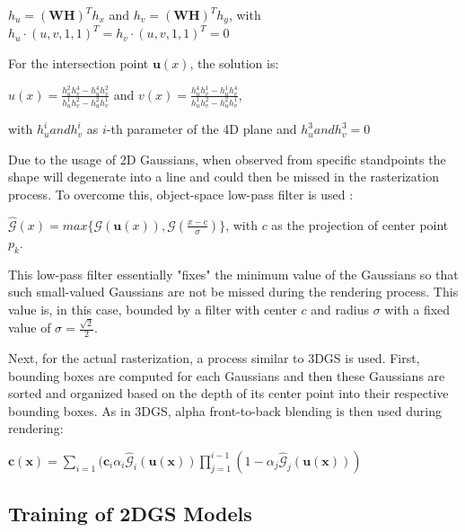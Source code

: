 \begin{center}
    \(h_u = (\mathbf{WH})^Th_x\) and \(h_v = (\mathbf{WH})^Th_y\),
    with \(h_u \cdot (u, v, 1, 1)^T = h_v \cdot (u, v, 1, 1)^T = 0\)
\end{center}

For the intersection point \(\mathbf{u}(x)\), the solution is:
\begin{center}
    \(u(x) = \frac{h^2_uh^4_v - h^4_uh^2_v}{h^1_uh^2_v - h^2_uh^1_v}\) and
    \(v(x) = \frac{h^4_uh^1_v - h^1_uh^4_v}{h^1_uh^2_v - h^2_uh^1_v}\), 
    
    with \(h^i_u and h^i_v\) as \(i\)-th parameter of the 4D plane and 
    \(h^3_u and h^3_v = 0\)
\end{center}

Due to the usage of 2D Gaussians, when observed from specific standpoints the shape will degenerate into a line and could then be missed in the rasterization process. To overcome this, object-space low-pass filter is used \parencite{lowpass}:

\begin{center}
    \(\hat{\mathcal{G}}(x) = max\{\mathcal{G}(\mathbf{u}(x)), \mathcal{G}(\frac{x - c}{\sigma})\}\),
    with \(c\) as the projection of center point \(p_k\).
\end{center}

This low-pass filter essentially "fixes" the minimum value of the Gaussians so that such small-valued Gaussians are not be missed during the rendering process. This value is, in this case, bounded by a filter with center \(c\) and radius \(\sigma\) with a fixed value of \(\sigma = \frac{\sqrt{2}}{2}\). 

Next, for the actual rasterization, a process similar to 3DGS is used. First, bounding boxes are computed for each Gaussians and then these Gaussians are sorted and organized based on the depth of its center point into their respective bounding boxes. As in 3DGS, alpha front-to-back blending is then used during rendering:

\begin{center}
    \(\mathbf{c(x)} = \sum\limits_{i = 1} (\mathbf{c}_i \alpha_i \hat{\mathcal{G}}_i (\mathbf{u(x)})\prod\limits_{j = 1}^{i - 1} (1 - \alpha_j \hat{\mathcal{G}}_j(\mathbf{u(x)}))\)
\end{center}

\subsection{Training of 2DGS Models}


